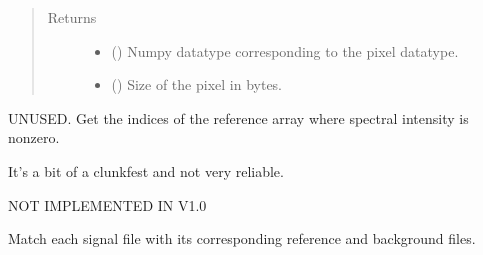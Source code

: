 \documentclass[a4paper,10pt,english]{sphinxmanual}
\begin{document}
\begin{fulllineitems}
\begin{fulllineitems}
\begin{quote}
\begin{description}
\item[{Returns}] \leavevmode
\sphinxAtStartPar
\begin{itemize}
\item {} 
\sphinxAtStartPar
{} () \textendash{} Numpy datatype corresponding to the pixel datatype.

\item {} 
\sphinxAtStartPar
{} () \textendash{} Size of the pixel in bytes.

\end{itemize}


\end{description}\end{quote}

\end{fulllineitems}


\begin{fulllineitems}
\label{\detokenize{sfgtools:sfgtools.SFGProcessTools.get_window}}
\sphinxAtStartPar
UNUSED. Get the indices of the reference array where spectral intensity is non\sphinxhyphen{}zero.

\sphinxAtStartPar
It’s a bit of a clunkfest and not very reliable.

\sphinxAtStartPar
NOT IMPLEMENTED IN V1.0

\end{fulllineitems}


\begin{fulllineitems}
\label{\detokenize{sfgtools:sfgtools.SFGProcessTools.match_files}}
\sphinxAtStartPar
Match each signal file with its corresponding reference and background files.


\end{fulllineitems}
\end{fulllineitems}
\end{document}
